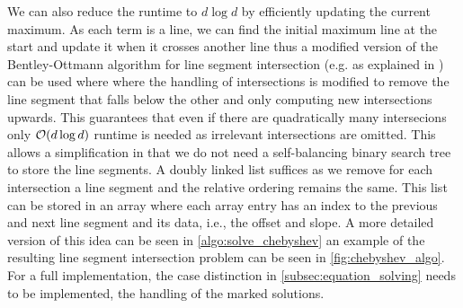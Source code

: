 We can also reduce the runtime to \(d \log d\) by efficiently updating the current maximum. As each term is a line, we can find the initial maximum line at the start and update it when it crosses another line thus a modified version of the Bentley-Ottmann algorithm for line segment intersection (e.g. as explained in \cite{computational_geometry}) can be used where where the handling of intersections is modified to remove the line segment that falls below the other and only computing new intersections upwards. This guarantees that even if there are quadratically many intersecions only \(\mathcal{O}(d \log d)\) runtime is needed as irrelevant intersections are omitted. 
This allows a simplification in that we do not need a self-balancing binary search tree to store the line segments. A doubly linked list suffices as we remove for each intersection a line segment and the relative ordering remains the same. This list can be stored in an array where each array entry has an index to the previous and next line segment and its data, i.e., the offset and slope. A more detailed version of this idea can be seen in \cref{algo:solve_chebyshev} an example of the resulting line segment intersection problem can be seen in \cref{fig:chebyshev_algo}. For a full implementation, the case distinction in \cref{subsec:equation_solving} needs to be implemented, the handling of the marked solutions.

